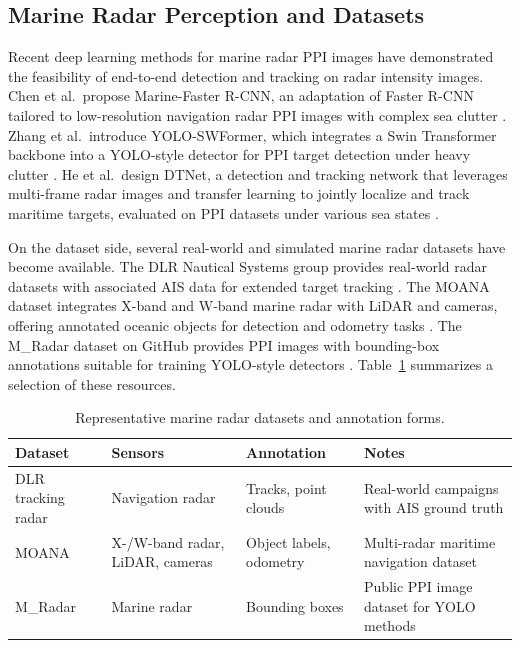 \documentclass[twocolumn, 10pt]{article}
\begin{document}
\subsection{Marine Radar Perception and Datasets}

Recent deep learning methods for marine radar PPI images have demonstrated the feasibility of end-to-end detection and tracking on radar intensity images. Chen et al.\ propose Marine-Faster R-CNN, an adaptation of Faster R-CNN tailored to low-resolution navigation radar PPI images with complex sea clutter \cite{Chen2022MarineFasterRCNN}. Zhang et al.\ introduce YOLO-SWFormer, which integrates a Swin Transformer backbone into a YOLO-style detector for PPI target detection under heavy clutter \cite{Zhang2023YoloSwformer}. He et al.\ design DTNet, a detection and tracking network that leverages multi-frame radar images and transfer learning to jointly localize and track maritime targets, evaluated on PPI datasets under various sea states \cite{He2025DTNet}.

On the dataset side, several real-world and simulated marine radar datasets have become available. The DLR Nautical Systems group provides real-world radar datasets with associated AIS data for extended target tracking \cite{DLRTrackingRadar}. The MOANA dataset integrates X-band and W-band marine radar with LiDAR and cameras, offering annotated oceanic objects for detection and odometry tasks \cite{Jang2025MOANA}. The M\_Radar dataset on GitHub provides PPI images with bounding-box annotations suitable for training YOLO-style detectors \cite{datasetMRadar}. Table~\ref{tab:radar_datasets} summarizes a selection of these resources.

\begin{table}[t]
    \centering
    \caption{Representative marine radar datasets and annotation forms.}
    \label{tab:radar_datasets}
    \begin{tabular}{p{1.7cm}p{2.0cm}p{1.4cm}p{2.0cm}}
        \toprule
        Dataset & Sensors & Annotation & Notes \\
        \midrule
        DLR tracking radar \cite{DLRTrackingRadar} & Navigation radar & Tracks, point clouds & Real-world campaigns with AIS ground truth \\
        MOANA \cite{Jang2025MOANA} & X-/W-band radar, LiDAR, cameras & Object labels, odometry & Multi-radar maritime navigation dataset \\
        M\_Radar \cite{datasetMRadar} & Marine radar & Bounding boxes & Public PPI image dataset for YOLO methods \\
        \bottomrule
    \end{tabular}
\end{table}
\end{document}
